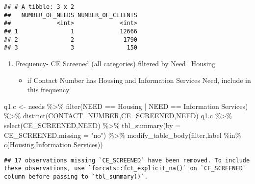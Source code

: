 \documentclass[
]{article}
\newenvironment{Shaded}{\begin{snugshade}}{\end{snugshade}}
\newcommand{\AttributeTok}[1]{\textcolor[rgb]{0.77,0.63,0.00}{#1}}
\newcommand{\FunctionTok}[1]{\textcolor[rgb]{0.00,0.00,0.00}{#1}}
\newcommand{\NormalTok}[1]{#1}
\newcommand{\OtherTok}[1]{\textcolor[rgb]{0.56,0.35,0.01}{#1}}
\newcommand{\SpecialCharTok}[1]{\textcolor[rgb]{0.00,0.00,0.00}{#1}}
\newcommand{\StringTok}[1]{\textcolor[rgb]{0.31,0.60,0.02}{#1}}
\providecommand{\tightlist}{%
  \setlength{\itemsep}{0pt}\setlength{\parskip}{0pt}}
\begin{document}
\begin{verbatim}
## # A tibble: 3 x 2
##   NUMBER_OF_NEEDS NUMBER_OF_CLIENTS
##             <int>             <int>
## 1               1             12666
## 2               2              1790
## 3               3               150
\end{verbatim}

\begin{enumerate}
\def\labelenumi{\alph{enumi}.}
\setcounter{enumi}{2}
\tightlist
\item
  Frequency- CE Screened (all categories) filtered by Need=Housing

  \begin{itemize}
  \tightlist
  \item
    if Contact Number has Housing and Information Services Need, include
    in this frequency
  \end{itemize}
\end{enumerate}

\begin{Shaded}
\begin{Highlighting}[]
\NormalTok{q1.c }\OtherTok{\textless{}{-}}\NormalTok{ needs }\SpecialCharTok{\%\textgreater{}\%} \FunctionTok{filter}\NormalTok{(NEED }\SpecialCharTok{==} \StringTok{\textquotesingle{}Housing\textquotesingle{}} \SpecialCharTok{|}\NormalTok{ NEED }\SpecialCharTok{==} \StringTok{\textquotesingle{}Information Services\textquotesingle{}}\NormalTok{) }\SpecialCharTok{\%\textgreater{}\%} \FunctionTok{distinct}\NormalTok{(CONTACT\_NUMBER,CE\_SCREENED,NEED)}
\NormalTok{q1.c }\SpecialCharTok{\%\textgreater{}\%} \FunctionTok{select}\NormalTok{(CE\_SCREENED,NEED) }\SpecialCharTok{\%\textgreater{}\%} \FunctionTok{tbl\_summary}\NormalTok{(}\AttributeTok{by =}\NormalTok{ CE\_SCREENED,}\AttributeTok{missing =} \StringTok{"no"}\NormalTok{) }\SpecialCharTok{\%\textgreater{}\%} \FunctionTok{modify\_table\_body}\NormalTok{(filter,label }\SpecialCharTok{\%in\%} \FunctionTok{c}\NormalTok{(}\StringTok{\textquotesingle{}Housing\textquotesingle{}}\NormalTok{,}\StringTok{\textquotesingle{}Information Services\textquotesingle{}}\NormalTok{))}
\end{Highlighting}
\end{Shaded}

\begin{verbatim}
## 17 observations missing `CE_SCREENED` have been removed. To include these observations, use `forcats::fct_explicit_na()` on `CE_SCREENED` column before passing to `tbl_summary()`.
\end{verbatim}
\end{document}
